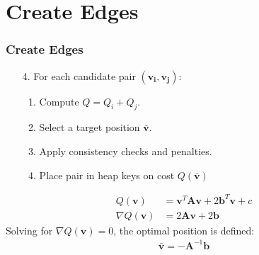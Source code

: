 \documentclass[
	10pt,
	t		%
]{beamer}
\begin{document}
\section{Create Edges}
\begin{frame}
\frametitle{Create Edges}
\centering
\begin{enumerate}
\item [4.] For each candidate pair $(\mathbf{v_i}, \mathbf{v_j})$:
\begin{enumerate}
\item Compute $Q = Q_i + Q_j$.
\item Select a target position $\mathbf{\bar{v}}$.
\item Apply consistency checks and penalties.
\item Place pair in heap keys on cost $Q(\mathbf{\bar{v}})$
\end{enumerate}
\end{enumerate}

\begin{align}
Q(\mathbf{v}) &= \mathbf{v}^T\mathbf{A}\mathbf{v} + 2\mathbf{b}^T\mathbf{v} + c\\
\nabla Q(\mathbf{v}) &= 2\mathbf{A}\mathbf{v} + 2 \mathbf{b}
\end{align}
Solving for $\nabla Q(\mathbf{v}) = 0$, the optimal position is defined:
\begin{align}
\mathbf{\bar{v}} = -\mathbf{A}^{-1}\mathbf{b}
\label{v_bar}
\end{align}

\end{frame}
\end{document}
